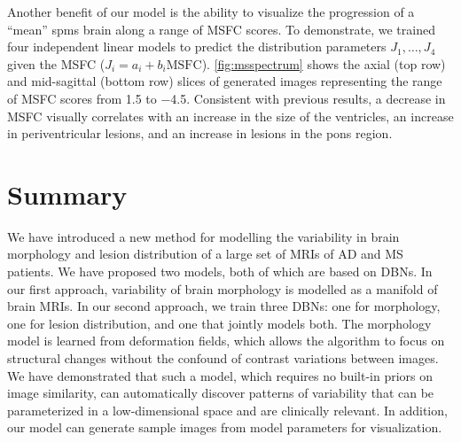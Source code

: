 Another benefit of our model is the ability to visualize the progression of a
``mean'' \gls{spms} brain along a range of MSFC scores.
To demonstrate, we trained four independent linear models to predict the
distribution parameters $J_1, \dotsc, J_4$ given the MSFC ($J_i = a_i +
b_i\text{MSFC}$). \ref{fig:msspectrum} shows the axial (top row) and
mid-sagittal (bottom row) slices of generated images representing the range of
MSFC scores from \num{1.5} to \num{-4.5}. Consistent with previous results, a
decrease in MSFC visually correlates with an increase in the size of the
ventricles, an increase in periventricular lesions, and an increase in lesions
in the pons region.

\section{Summary}


We have introduced a new method for modelling the variability in brain morphology
and lesion distribution of a large set of MRIs of AD and MS patients. We have
proposed two models, both of which are based on DBNs. In our first approach,
variability of brain morphology is modelled as a manifold of brain MRIs. In our
second approach, we train three DBNs: one for morphology, one for lesion
distribution, and one that jointly models both. The morphology model is learned
from deformation fields, which allows the algorithm to focus on structural
changes without the confound of contrast variations between images. We have
demonstrated that such a model, which requires no built-in priors on image
similarity, can automatically discover patterns of variability that can be
parameterized in a low-dimensional space and are clinically relevant. In
addition, our model can generate sample images from model parameters for
visualization. 

